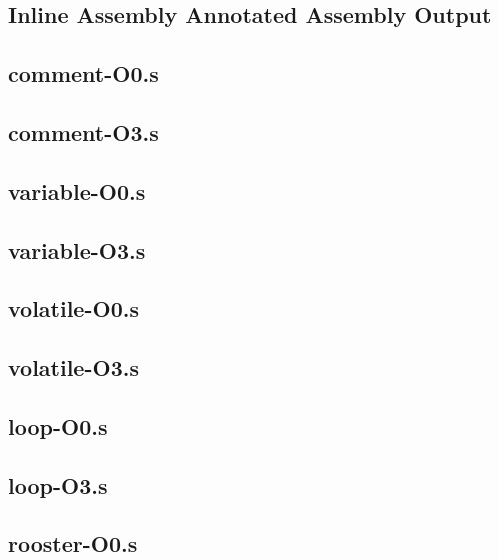 \begin{appendices}
\section{Inline Assembly Annotated Assembly Output}
\label{app:inlineAnnotatedAssembly}
\lstset{language=[x64]Assembler}
\subsection{comment-O0.s}

\subsection{comment-O3.s}


\subsection{variable-O0.s}

\subsection{variable-O3.s}


\subsection{volatile-O0.s}

\subsection{volatile-O3.s}


\subsection{loop-O0.s}

\subsection{loop-O3.s}


\subsection{rooster-O0.s}


\end{appendices}
